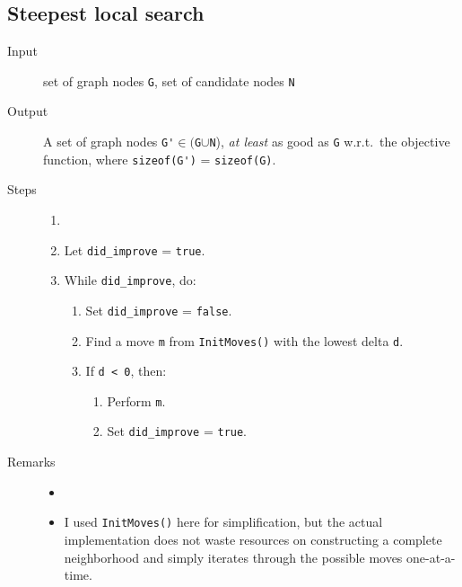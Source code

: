 \documentclass[14pt]{article}
\begin{document}
\subsection{Steepest local search}
\begin{description}
	\item [Input] set of graph nodes \verb`G`, set of candidate nodes \verb`N`
	\item [Output] A set of graph nodes \verb`G'`$ ∈ ($\verb`G`$∪$\verb`N`),
		\emph{at least} as good as \verb`G` w.r.t.\ the objective function,
		where \verb`sizeof(G')` = \verb`sizeof(G)`.
	\item [Steps]
		\begin{enumerate}\item []
			\item Let \verb`did_improve` = \verb`true`.
			\item While \verb`did_improve`, do:
				\begin{enumerate}
					\item Set \verb`did_improve` = \verb`false`.
					\item Find a move \verb`m` from \verb`InitMoves()` with the lowest delta \verb`d`.
					\item If \verb`d < 0`, then:
						\begin{enumerate}
							\item Perform \verb`m`.
							\item Set \verb`did_improve` = \verb`true`.
						\end{enumerate}
				\end{enumerate}
		\end{enumerate}
	\item [Remarks]
		\begin{itemize}\item []
			\item I used \verb`InitMoves()` here for simplification, but the
				actual implementation does not waste resources on constructing
				a complete neighborhood and simply iterates through the
				possible moves one-at-a-time.
		\end{itemize}
\end{description}

\newpage
\end{document}
